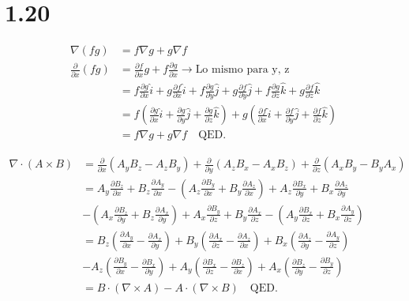 \documentclass[12pt]{article}
\begin{document}
\section*{1.20}

\begin{align*}
\nabla(fg) &= f\nabla g + g \nabla f \\
\frac{\partial}{\partial x}(fg) &= \frac{\partial f}{\partial x}g + f\frac{\partial g}{\partial x} \rightarrow \text{Lo mismo para y, z} \\
&= f\frac{\partial g}{\partial x}\hat{i} + g\frac{\partial f}{\partial x}\hat{i} + f\frac{\partial g}{\partial y}\hat{j} + g\frac{\partial f}{\partial y}\hat{j} + f\frac{\partial g}{\partial z}\hat{k} + g\frac{\partial f}{\partial z}\hat{k} \\
&= f\left(\frac{\partial g}{\partial x}\hat{i} + \frac{\partial g}{\partial y}\hat{j} + \frac{\partial g}{\partial z}\hat{k}\right) + g\left(\frac{\partial f}{\partial x}\hat{i} + \frac{\partial f}{\partial y}\hat{j} + \frac{\partial f}{\partial z}\hat{k}\right) \\
&= f\nabla g + g\nabla f \quad \text{QED.}
\end{align*}

\vspace{0.5cm}


\begin{align*}
\nabla\cdot(A\times B) &= \frac{\partial}{\partial x}(A_yB_z - A_zB_y) + \frac{\partial}{\partial y}(A_zB_x - A_xB_z) + \frac{\partial}{\partial z}(A_xB_y - B_yA_x) \\
&= A_y\frac{\partial B_z}{\partial x} + B_z\frac{\partial A_y}{\partial x} - \left(A_z\frac{\partial B_y}{\partial x} + B_y\frac{\partial A_z}{\partial x}\right) + A_z\frac{\partial B_x}{\partial y} + B_x\frac{\partial A_z}{\partial y} \\
&- \left(A_x\frac{\partial B_z}{\partial y} + B_z\frac{\partial A_x}{\partial y}\right) + A_x\frac{\partial B_y}{\partial z} + B_y\frac{\partial A_x}{\partial z} - \left(A_y\frac{\partial B_x}{\partial z} + B_x\frac{\partial A_y}{\partial z}\right) \\
&= B_z\left(\frac{\partial A_y}{\partial x} - \frac{\partial A_x}{\partial y}\right) + B_y\left(\frac{\partial A_x}{\partial z} - \frac{\partial A_z}{\partial x}\right) + B_x\left(\frac{\partial A_z}{\partial y} - \frac{\partial A_y}{\partial z}\right) \\
&- A_z\left(\frac{\partial B_y}{\partial x} - \frac{\partial B_x}{\partial y}\right) + A_y\left(\frac{\partial B_x}{\partial z} - \frac{\partial B_z}{\partial x}\right) + A_x\left(\frac{\partial B_z}{\partial y} - \frac{\partial B_y}{\partial z}\right) \\
&= B\cdot(\nabla\times A) - A\cdot(\nabla\times B) \quad \text{QED.}
\end{align*}
\end{document}
